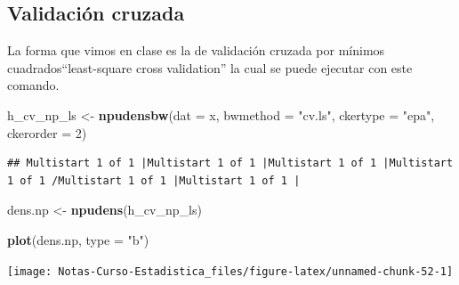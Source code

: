 \documentclass[
  12pt,
]{book}
\newenvironment{Shaded}{\begin{snugshade}}{\end{snugshade}}
\newcommand{\DataTypeTok}[1]{\textcolor[rgb]{0.13,0.29,0.53}{#1}}
\newcommand{\DecValTok}[1]{\textcolor[rgb]{0.00,0.00,0.81}{#1}}
\newcommand{\KeywordTok}[1]{\textcolor[rgb]{0.13,0.29,0.53}{\textbf{#1}}}
\newcommand{\NormalTok}[1]{#1}
\newcommand{\StringTok}[1]{\textcolor[rgb]{0.31,0.60,0.02}{#1}}
\theoremstyle{definition}
\theoremstyle{definition}
\theoremstyle{definition}
\theoremstyle{remark}
\begin{document}
\hypertarget{validaciuxf3n-cruzada-1}{%
\subsection{Validación cruzada}\label{validaciuxf3n-cruzada-1}}

La forma que vimos en clase es la de validación cruzada por mínimos
cuadrados``least-square cross validation'' la cual se puede ejecutar
con este comando.

\begin{Shaded}
\begin{Highlighting}[]
\NormalTok{h_cv_np_ls <-}\StringTok{ }\KeywordTok{npudensbw}\NormalTok{(}\DataTypeTok{dat =}\NormalTok{ x, }\DataTypeTok{bwmethod =} \StringTok{"cv.ls"}\NormalTok{, }
    \DataTypeTok{ckertype =} \StringTok{"epa"}\NormalTok{, }\DataTypeTok{ckerorder =} \DecValTok{2}\NormalTok{)}
\end{Highlighting}
\end{Shaded}

\begin{verbatim}
## Multistart 1 of 1 |Multistart 1 of 1 |Multistart 1 of 1 |Multistart 1 of 1 /Multistart 1 of 1 |Multistart 1 of 1 |                   
\end{verbatim}

\begin{Shaded}
\begin{Highlighting}[]
\NormalTok{dens.np <-}\StringTok{ }\KeywordTok{npudens}\NormalTok{(h_cv_np_ls)}

\KeywordTok{plot}\NormalTok{(dens.np, }\DataTypeTok{type =} \StringTok{"b"}\NormalTok{)}
\end{Highlighting}
\end{Shaded}

\begin{center}\texttt{[image: Notas-Curso-Estadistica\_files/figure-latex/unnamed-chunk-52-1]} \end{center}
\end{document}
